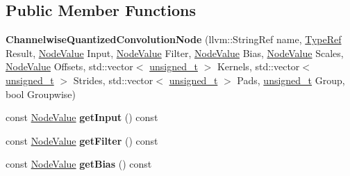 \subsection*{Public Member Functions}
\begin{DoxyCompactItemize}
\item 
\mbox{\label{classglow_1_1_channelwise_quantized_convolution_node_aab693e948dd3f4b448e447bf5c617bb2}} 
{\bfseries Channelwise\+Quantized\+Convolution\+Node} (llvm\+::\+String\+Ref name, \hyperlink{structglow_1_1_type}{Type\+Ref} Result, \hyperlink{structglow_1_1_node_value}{Node\+Value} Input, \hyperlink{structglow_1_1_node_value}{Node\+Value} Filter, \hyperlink{structglow_1_1_node_value}{Node\+Value} Bias, \hyperlink{structglow_1_1_node_value}{Node\+Value} Scales, \hyperlink{structglow_1_1_node_value}{Node\+Value} Offsets, std\+::vector$<$ \hyperlink{namespaceglow_a0ca574644e1e42ef193a9947fb4d8911}{unsigned\+\_\+t} $>$ Kernels, std\+::vector$<$ \hyperlink{namespaceglow_a0ca574644e1e42ef193a9947fb4d8911}{unsigned\+\_\+t} $>$ Strides, std\+::vector$<$ \hyperlink{namespaceglow_a0ca574644e1e42ef193a9947fb4d8911}{unsigned\+\_\+t} $>$ Pads, \hyperlink{namespaceglow_a0ca574644e1e42ef193a9947fb4d8911}{unsigned\+\_\+t} Group, bool Groupwise)
\item 
\mbox{\label{classglow_1_1_channelwise_quantized_convolution_node_a8a931710505d1f2851a91097ad207399}} 
const \hyperlink{structglow_1_1_node_value}{Node\+Value} {\bfseries get\+Input} () const
\item 
\mbox{\label{classglow_1_1_channelwise_quantized_convolution_node_a77f7210fc4763e9d1d880b87107c7eed}} 
const \hyperlink{structglow_1_1_node_value}{Node\+Value} {\bfseries get\+Filter} () const
\item 
\mbox{\label{classglow_1_1_channelwise_quantized_convolution_node_ab88ac7292b291618b5569cd9a86d85f1}} 
const \hyperlink{structglow_1_1_node_value}{Node\+Value} {\bfseries get\+Bias} () const
\item 
\mbox{\label{classglow_1_1_channelwise_quantized_convolution_node_ae7a9db0715b44a037c7e8f81ea6fba03}} 

\end{DoxyCompactItemize}
